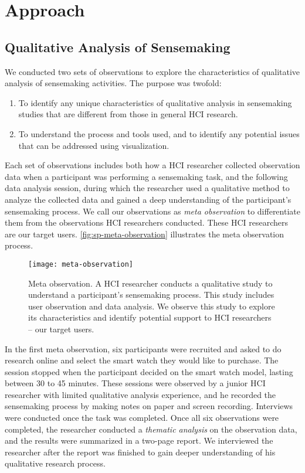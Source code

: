\section{Approach}

\subsection{Qualitative Analysis of Sensemaking}
We conducted two sets of observations to explore the characteristics of qualitative analysis of sensemaking activities. The purpose was twofold:
\begin{enumerate}
	\item To identify any unique characteristics of qualitative analysis in sensemaking studies that are different from those in general HCI research.
	\item To understand the process and tools used, and to identify any potential issues that can be addressed using visualization.
\end{enumerate}

Each set of observations includes both how a HCI researcher collected observation data when a participant was performing a sensemaking task, and the following data analysis session, during which the researcher used a qualitative method to analyze the collected data and gained a deep understanding of the participant's sensemaking process. We call our observations as \emph{meta observation} to differentiate them from the observations HCI researchers conducted. These HCI researchers are our target users. \autoref{fig:sp-meta-observation} illustrates the meta observation process.

\begin{figure}[!htb]
 	\centering
 	\texttt{[image: meta-observation]}
 	\caption{Meta observation. A HCI researcher conducts a qualitative study to understand a participant's sensemaking process. This study includes user observation and data analysis. We observe this study to explore its characteristics and identify potential support to HCI researchers -- our target users.}
 	\label{fig:sp-meta-observation}
\end{figure}

In the first meta observation, six participants were recruited and asked to do research online and select the smart watch they would like to purchase. The session stopped when the participant decided on the smart watch model, lasting between 30 to 45 minutes. These sessions were observed by a junior HCI researcher with limited qualitative analysis experience, and he recorded the sensemaking process by making notes on paper and screen recording. Interviews were conducted once the task was completed. Once all six observations were completed, the researcher conducted a \emph{thematic analysis} on the observation data, and the results were summarized in a two-page report. We interviewed the researcher after the report was finished to gain deeper understanding of his qualitative research process.

